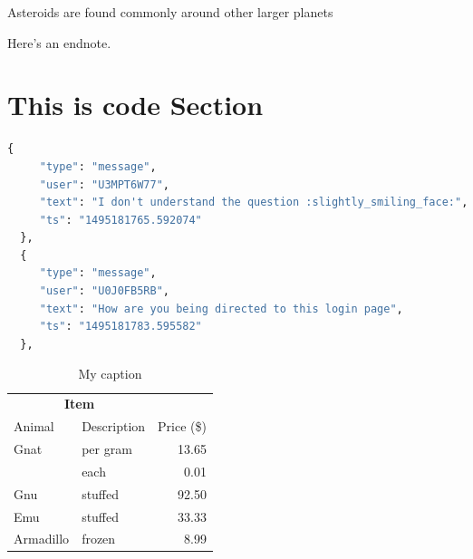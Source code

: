 \lipsum[3] Asteroids are found commonly around other larger planets

\lipsum[4-5] 

Here's an endnote.

\section{This is code Section}

\begin{lstlisting}[language=Python, caption=JSON example]
 {
     "type": "message",
     "user": "U3MPT6W77",
     "text": "I don't understand the question :slightly_smiling_face:",
     "ts": "1495181765.592074"
  },
  {
     "type": "message",
     "user": "U0J0FB5RB",
     "text": "How are you being directed to this login page",
     "ts": "1495181783.595582"
  },
\end{lstlisting}





\begin{table}[]
\centering
\caption{My caption}
\label{my-label}
\begin{tabular}{llr}
\hline
\multicolumn{2}{c}{\textbf{Item}} &            \\ \cline{1-2}
Animal         & Description      & Price (\$) \\ \hline
Gnat           & per gram         & 13.65      \\
               & each             & 0.01       \\
Gnu            & stuffed          & 92.50      \\
Emu            & stuffed          & 33.33      \\
Armadillo      & frozen           & 8.99       \\ \hline
\end{tabular}
\end{table}